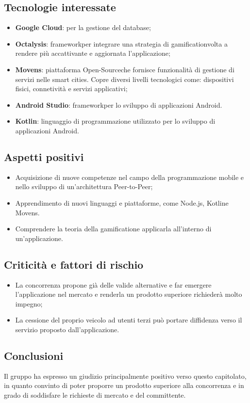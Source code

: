 \subsection{Tecnologie interessate}
\begin{itemize}	
	\item \textbf{Google Cloud}: per la gestione del database;
	\item \textbf{Octalysis\glosp}: framework\glosp per integrare una strategia di gamification\glosp volta a rendere più accattivante e aggiornata l'applicazione;
	\item \textbf{Movens\glosp}: piattaforma Open-Source\glosp che fornisce funzionalità di gestione di servizi nelle smart cities. Copre diversi livelli tecnologici come: dispositivi fisici, connetività e servizi applicativi;	
	\item \textbf{Android Studio}: framework\glosp per lo sviluppo di applicazioni Android.
	\item \textbf{Kotlin\glosp}: linguaggio di programmazione utilizzato per lo sviluppo di applicazioni Android.
\end{itemize}
\subsection{Aspetti positivi}
\begin{itemize}
	\item Acquisizione di nuove competenze nel campo della programmazione mobile e nello sviluppo di un'architettura Peer-to-Peer\glosp;
	\item Apprendimento di nuovi linguaggi e piattaforme, come Node.js\glo, Kotlin\glosp e Movens\glosp.
	\item Comprendere la teoria della gamification\glosp e applicarla all'interno di un'applicazione.
\end{itemize}
\subsection{Criticità e fattori di rischio}
\begin{itemize}
	\item La concorrenza propone già delle valide alternative e far emergere l'applicazione nel mercato e renderla un prodotto superiore richiederà molto impegno;
	\item La cessione del proprio veicolo ad utenti terzi può portare diffidenza verso il servizio proposto dall'applicazione.
\end{itemize}
\subsection{Conclusioni}
Il gruppo ha espresso un giudizio principalmente positivo verso questo capitolato\glo,
in quanto convinto di poter proporre un prodotto superiore alla concorrenza e in grado di soddisfare le richieste di mercato e del committente.
